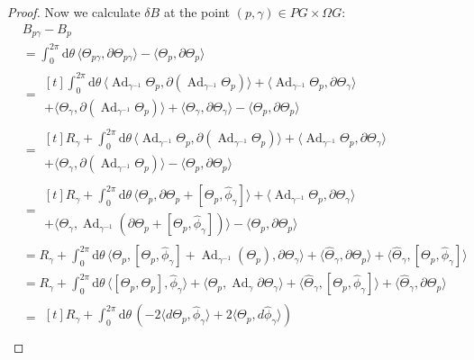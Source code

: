 \documentclass[12pt]{amsart}
\DeclareMathOperator{\Ad}{Ad}
\theoremstyle{plain}
\theoremstyle{definition}
\theoremstyle{remark}
\numberwithin{equation}{section}
\renewcommand{\d}{\delta}
\newcommand{\<}{\langle}
\renewcommand{\>}{\rangle}
\newcommand{\intSone}{\int_{0}^{2\pi}\mathrm{d}\theta\,}
\newcommand{\Thetahat}{\widehat{\Theta}}
\newcommand{\phihat}{\widehat{\phi}}
\begin{document}
\begin{proof}
Now we calculate $\d B$ at the point $(p,\gamma)\in PG\times \Omega G$:
\begin{align*}
&B_{p\gamma} - B_p \\
& = \intSone 
\langle \Theta_{p\gamma}, \partial \Theta_{p\gamma}\rangle 
- \langle\Theta_p, \partial \Theta_p \rangle \\
& = \begin{multlined}[t]\intSone \langle \Ad_{\gamma^{-1}}\Theta_p, \partial(\Ad_{\gamma^{-1}}\Theta_p)\rangle 
+ \langle\Ad_{\gamma^{-1}}\Theta_p, \partial\Theta_\gamma\rangle \\
+ \langle\Theta_\gamma,\partial(\Ad_{\gamma^{-1}}\Theta_p)\rangle
+ \langle\Theta_\gamma,\partial \Theta_{\gamma}\rangle 
- \langle\Theta_p, \partial \Theta_p \rangle 
\end{multlined}\\
& = \begin{multlined}[t]
R_\gamma + \intSone \langle \Ad_{\gamma^{-1}}\Theta_p, \partial(\Ad_{\gamma^{-1}}\Theta_p)\rangle 
+ \langle\Ad_{\gamma^{-1}}\Theta_p, \partial\Theta_\gamma\rangle \\
+ \langle\Theta_\gamma,\partial(\Ad_{\gamma^{-1}}\Theta_p)\rangle
- \langle\Theta_p, \partial \Theta_p\rangle
\end{multlined} \\
& =  \begin{multlined}[t]R_\gamma + \intSone 
\langle  \Theta_p,\partial\Theta_p + [\Theta_p,\phihat_\gamma]\rangle 
+\langle\Ad_{\gamma^{-1}}\Theta_p,\partial\Theta_\gamma \rangle \\
+\langle\Theta_\gamma,\Ad_{\gamma^{-1}}(\partial\Theta_p + [\Theta_p,\phihat_\gamma])\rangle 
- \langle\Theta_p,\partial\Theta_p\rangle
\end{multlined} \\
 & = R_\gamma + \intSone 
 \langle \Theta_p,[\Theta_p,\phihat_\gamma] + \Ad_{\gamma^{-1}}(\Theta_p),\partial\Theta_\gamma\rangle
+\langle\Thetahat_\gamma,\partial\Theta_p \rangle
+ \langle\Thetahat_\gamma,[\Theta_p,\phihat_\gamma]\rangle \\
 & = R_\gamma + \intSone 
 \langle [\Theta_p,\Theta_p],\phihat_\gamma\rangle
 + \langle\Theta_p ,\Ad_{\gamma}\partial\Theta_\gamma \rangle
 + \langle\Thetahat_\gamma,[\Theta_p,\phihat_\gamma] \rangle
+ \langle\Thetahat_\gamma, \partial\Theta_p\rangle \\
 & = \begin{multlined}[t]
 R_\gamma + \intSone 
  \left(-2\langle d\Theta_p,\phihat_\gamma \rangle
  + 2\langle\Theta_p,d\phihat_\gamma \rangle \right)\\

\end{multlined}
\end{align*}
\end{proof}
\end{document}
